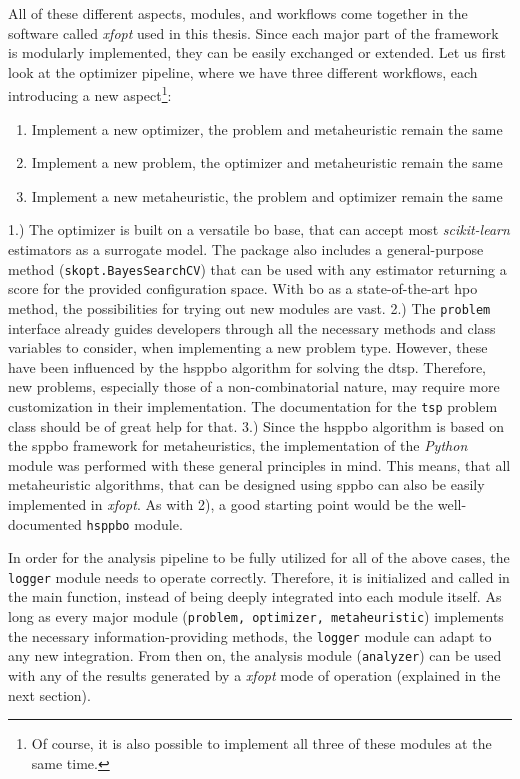 All of these different aspects, modules, and workflows come together in the software called \textit{\gls{xfopt}} used in this thesis. Since each major part of the framework is
modularly implemented, they can be easily exchanged or extended. Let us first look at the optimizer pipeline, where we have three different workflows, each introducing a new aspect\footnote{Of course, it is also possible to implement all three of these modules at the same time.}:
\begin{enumerate}
	\item Implement a new optimizer, the problem and metaheuristic remain the same 
	\item Implement a new problem, the optimizer and metaheuristic remain the same 
	\item Implement a new metaheuristic, the problem and optimizer remain the same
\end{enumerate}
1.) The optimizer is built on a versatile \gls{bo} base, that can accept most \textit{scikit-learn} estimators as a surrogate model. The package also includes a general-purpose method (\texttt{skopt.BayesSearchCV}) that can be used with any estimator returning a score for the provided configuration space. With \gls{bo} as a state-of-the-art \glsdesc{hpo} method, the possibilities for trying out new modules are vast.
2.) The \texttt{problem} interface already guides developers through all the necessary methods and class variables to consider, when implementing a new problem type. However, these have been influenced by the \gls{hsppbo} algorithm for solving the \gls{dtsp}. Therefore, new problems, especially those of a non-combinatorial nature, may require more customization in their implementation. The documentation for the \texttt{tsp} problem class should be of great help for that.
3.) Since the \gls{hsppbo} algorithm is based on the \gls{sppbo} framework for metaheuristics, the implementation of the \textit{Python} module was performed with these general principles in mind. This means, that all metaheuristic algorithms, that can be designed using \gls{sppbo} can also be easily implemented in \textit{\gls{xfopt}}. As with 2), a good starting point would be the well-documented \texttt{hsppbo} module.
 
In order for the analysis pipeline to be fully utilized for all of the above cases, the \texttt{logger} module needs to operate correctly. Therefore, it is initialized and called in the main function, instead of being deeply integrated into each module itself. As long as every major module (\texttt{problem, optimizer, metaheuristic}) implements the necessary information-providing methods, the \texttt{logger} module can adapt to any new integration. From then on, the analysis module (\texttt{analyzer}) can be used with any of the results generated by a \textit{\gls{xfopt}} mode of operation (explained in the next section).

